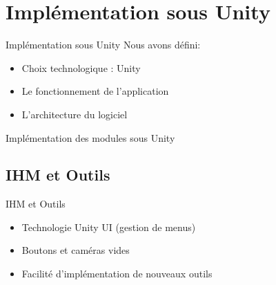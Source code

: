 \documentclass[a4paper,10pt]{beamer}
\begin{document}
	\section{Implémentation sous Unity}
			\begin{frame}{Implémentation sous Unity}
				Nous avons défini:
					\begin{itemize}
						\item Choix technologique : Unity
						\item Le fonctionnement de l'application
						\item L'architecture du logiciel
					\end{itemize}
				Implémentation des modules sous Unity
			\end{frame}
		
	\subsection{IHM et Outils}
	\begin{frame}{IHM et Outils}

				\begin{itemize}
					\item Technologie Unity UI (gestion de menus)
					\item Boutons et caméras vides
					\item Facilité d'implémentation de nouveaux outils
				\end{itemize}
			
	\end{frame}
	
\end{document}
